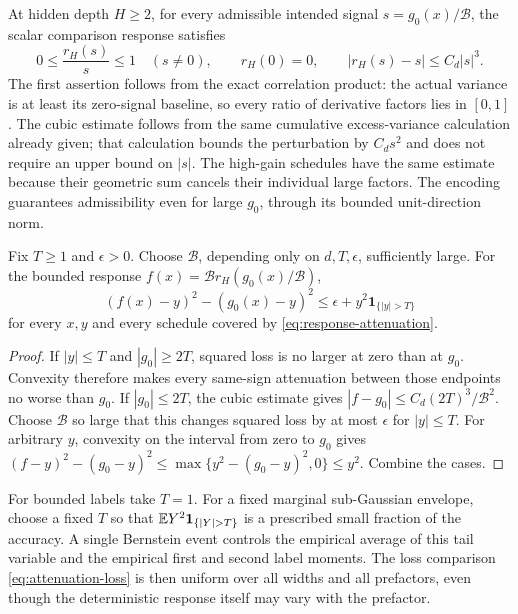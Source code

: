 At hidden depth $H\ge2$, for every admissible intended signal $s=g_0(x)/\mathcal B$, the scalar comparison response satisfies
\begin{equation}
 0\le\frac{r_H(s)}s\le1\quad(s\ne0),\qquad
 r_H(0)=0,
 \qquad |r_H(s)-s|\le C_d|s|^3.
 \label{eq:response-attenuation}
\end{equation}
The first assertion follows from the exact correlation product: the actual variance is at least its zero-signal baseline, so every ratio of derivative factors lies in $[0,1]$. The cubic estimate follows from the same cumulative excess-variance calculation already given; that calculation bounds the perturbation by $C_ds^2$ and does not require an upper bound on $|s|$. The high-gain schedules have the same estimate because their geometric sum cancels their individual large factors. The encoding guarantees admissibility even for large $g_0$, through its bounded unit-direction norm.

\begin{lemma}
\label{lem:attenuation-loss}
Fix $T\ge1$ and $\epsilon>0$. Choose $\mathcal B$, depending only on $d,T,\epsilon$, sufficiently large. For the bounded response $f(x)=\mathcal B r_H(g_0(x)/\mathcal B)$,
\begin{equation}
 (f(x)-y)^2-(g_0(x)-y)^2
 \le\epsilon+y^2\mathbf1_{\{|y|>T\}}
 \label{eq:attenuation-loss}
\end{equation}
for every $x,y$ and every schedule covered by \eqref{eq:response-attenuation}.
\end{lemma}
\begin{proof}
If $|y|\le T$ and $|g_0|\ge2T$, squared loss is no larger at zero than at $g_0$. Convexity therefore makes every same-sign attenuation between those endpoints no worse than $g_0$. If $|g_0|\le2T$, the cubic estimate gives
$|f-g_0|\le C_d(2T)^3/\mathcal B^2$. Choose $\mathcal B$ so large that this changes squared loss by at most $\epsilon$ for $|y|\le T$.
For arbitrary $y$, convexity on the interval from zero to $g_0$ gives
$(f-y)^2-(g_0-y)^2\le\max\{y^2-(g_0-y)^2,0\}\le y^2$.
Combine the cases.
\end{proof}

For bounded labels take $T=1$. For a fixed marginal sub-Gaussian envelope, choose a fixed $T$ so that $\E Y^2\mathbf1_{\{|Y|>T\}}$ is a prescribed small fraction of the accuracy. A single Bernstein event controls the empirical average of this tail variable and the empirical first and second label moments. The loss comparison \eqref{eq:attenuation-loss} is then uniform over all widths and all prefactors, even though the deterministic response itself may vary with the prefactor.

